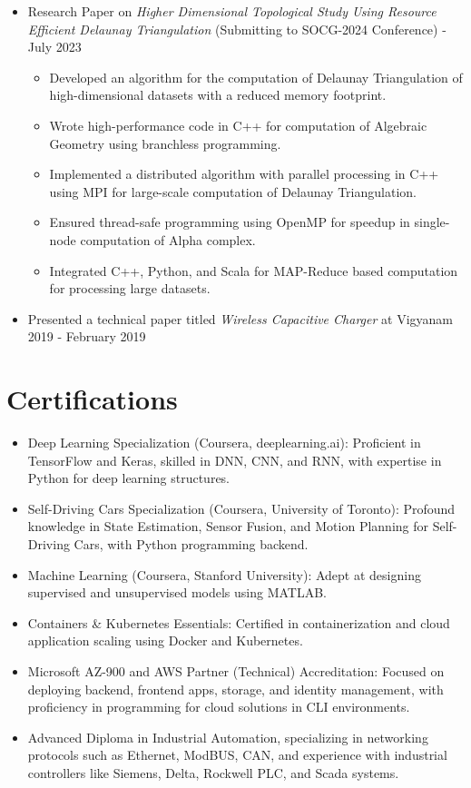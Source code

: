 \documentclass[]{article}
\begin{document}
	\begin{itemize}
		\item Research Paper on \emph{Higher Dimensional Topological Study Using Resource Efficient Delaunay Triangulation} (Submitting to SOCG-2024 Conference) - July 2023
		\begin{itemize}
			\item Developed an algorithm for the computation of Delaunay Triangulation of high-dimensional datasets with a reduced memory footprint.
			\item Wrote high-performance code in C++ for computation of Algebraic Geometry using branchless programming.
			\item Implemented a distributed algorithm with parallel processing in C++ using MPI for large-scale computation of Delaunay Triangulation.
			\item Ensured thread-safe programming using OpenMP for speedup in single-node computation of Alpha complex.
			\item Integrated C++, Python, and Scala for MAP-Reduce based computation for processing large datasets.
		\end{itemize}
		\item Presented a technical paper titled \emph{Wireless Capacitive Charger} at Vigyanam 2019 - February 2019
	\end{itemize}

	\section*{Certifications}

	\begin{itemize}
		\item Deep Learning Specialization (Coursera, deeplearning.ai): Proficient in TensorFlow and Keras, skilled in DNN, CNN, and RNN, with expertise in Python for deep learning structures.
		\item Self-Driving Cars Specialization (Coursera, University of Toronto): Profound knowledge in State Estimation, Sensor Fusion, and Motion Planning for Self-Driving Cars, with Python programming backend.
		\item Machine Learning (Coursera, Stanford University): Adept at designing supervised and unsupervised models using MATLAB.
		\item Containers \& Kubernetes Essentials: Certified in containerization and cloud application scaling using Docker and Kubernetes.
		\item Microsoft AZ-900 and AWS Partner (Technical) Accreditation: Focused on deploying backend, frontend apps, storage, and identity management, with proficiency in programming for cloud solutions in CLI environments.
		\item Advanced Diploma in Industrial Automation, specializing in networking protocols such as Ethernet, ModBUS, CAN, and experience with industrial controllers like Siemens, Delta, Rockwell PLC, and Scada systems.
	\end{itemize}
\end{document}
